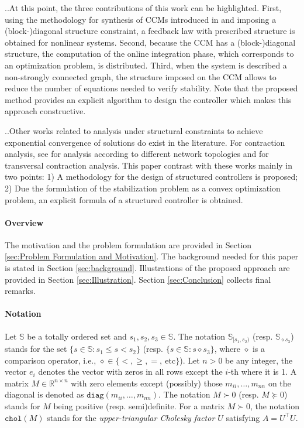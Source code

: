 \documentclass[10pt,twocolumn,twoside]{IEEEtran}
\newcounter{para}
\newcommand\mypara{\par \thesection.\refstepcounter{para}\thepara.\space}
\theoremstyle{plain}
\theoremstyle{definition}
\theoremstyle{remark}
\begin{document}
\mypara At this point, the three contributions of this work can be highlighted. First, using the methodology for synthesis of CCMs introduced in \cite{Manchester2014a} and imposing a (block-)diagonal structure constraint, a feedback law with prescribed structure is obtained for nonlinear systems. Second, because the CCM has a (block-)diagonal structure, the computation of the online integration phase, which corresponds to an optimization problem, is distributed. Third, when the system is described a non-strongly connected graph, the structure imposed on the CCM allows to reduce the number of equations needed to  verify stability. Note that the proposed method provides an explicit algorithm to design the controller which makes this approach constructive.

\mypara Other works related to analysis under structural constraints to achieve exponential convergence of solutions do exist in the literature. For contraction analysis, see \cite{Aminzare2014a} for analysis according to different network topologies and \cite{Andrieu2016} for transversal contraction analysis. This paper contrast with these works mainly in two points: 1) A  methodology for the design of structured controllers is proposed; 2) Due the formulation of the stabilization problem as a convex optimization problem, an explicit formula of a structured controller is obtained.

\paragraph{Overview} The motivation and the problem formulation are provided in Section \ref{sec:Problem Formulation and Motivation}. The background needed for this paper is stated in Section \ref{sec:background}. Illustrations of the proposed approach are provided in Section \ref{sec:Illustration}. Section \ref{sec:Conclusion} collects final remarks.

\paragraph{Notation} Let $\mathbb{S}$ be a totally ordered set and $s_1,s_2,s_3\in\mathbb{S}$. The notation $\mathbb{S}_{[s_1,s_2)}$ (resp. $\mathbb{S}_{\diamond s_3}$) stands for the set $\{s\in\mathbb{S}:s_1\leq s< s_2\}$ (resp. $\{s\in\mathbb{S}:s\diamond s_3\}$, where $\diamond$ is a comparison operator, i.e., $\diamond\in\{<,\geq,=,\ \text{etc}\}$). Let $n>0$ be any integer, the vector $e_i$ denotes the vector with zeros in all rows except the $i$-th where it is 1. A matrix $M\in\mathbb{R}^{n\times n}$ with zero elements except (possibly) those  $m_{ii},\ldots,m_{nn}$ on the diagonal is denoted as $\mathbin{\mathtt{diag}}(m_{ii},\ldots,m_{nn})$. The notation $M\succ 0$ (resp. $M\succeq 0$) stands for $M$ being positive (resp. semi)definite. For a matrix $M\succ0$, the notation $\mathbin{\mathtt{chol}}(M)$ stands for the \emph{upper-triangular Cholesky factor $U$} satisfying $A=U^\top U$.
\end{document}
